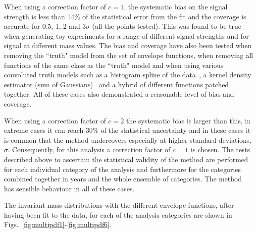 When using a correction factor of $c=1$, the systematic bias on the signal strength is less than 14\% of the statistical error from the fit and the coverage is accurate for 0.5, 1, 2 and 3$\sigma$ (all the points tested). This was found to be true when generating toy experiments for a range of different signal strengths and for signal at different mass values. The bias and coverage have also been tested when removing the ``truth" model from the set of envelope functions, when removing all functions of the same class as the ``truth" model and when using various convoluted truth models such as a histogram spline of the data~\cite{regression_spline}, a kernel density estimator (sum of Gaussians)~\cite{kde} and a hybrid of different functions patched together. All of these cases also demonstrated a reasonable level of bias and coverage. 

When using a correction factor of $c=2$ the systematic bias is larger than this, in extreme cases it can reach 30\% of the statistical uncertainty and in these cases it is common that the method undercovers especially at higher standard deviations, $\sigma$. Consequently, for this analysis a correction factor of $c=1$ is chosen. The tests described above to ascertain the statistical validity of the method are performed for each individual category of the analysis and furthermore for the categories combined together in years and the whole ensemble of categories. The method has sensible behaviour in all of these cases.

The invariant mass distributions with the different envelope functions, after having been fit to the data, for each of the analysis categories are shown in Figs.~\ref{fig:multipdf1}-\ref{fig:multipdf6}.

